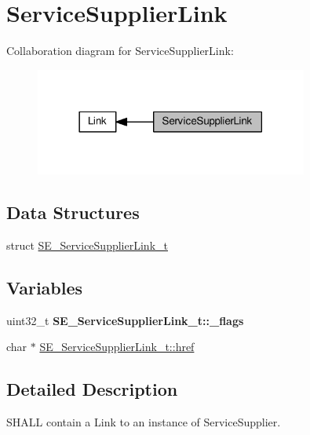 \hypertarget{group__ServiceSupplierLink}{}\section{Service\+Supplier\+Link}
\label{group__ServiceSupplierLink}
Collaboration diagram for Service\+Supplier\+Link\+:\nopagebreak
\begin{figure}[H]
\begin{center}
\leavevmode
\includegraphics[width=254pt]{group__ServiceSupplierLink}
\end{center}
\end{figure}
\subsection*{Data Structures}
\begin{DoxyCompactItemize}
\item 
struct \hyperlink{structSE__ServiceSupplierLink__t}{S\+E\+\_\+\+Service\+Supplier\+Link\+\_\+t}
\end{DoxyCompactItemize}
\subsection*{Variables}
\begin{DoxyCompactItemize}
\item 
\mbox{\label{group__ServiceSupplierLink_gaffd3096ebae224a19d9b6430dd13fb06}} 
uint32\+\_\+t {\bfseries S\+E\+\_\+\+Service\+Supplier\+Link\+\_\+t\+::\+\_\+flags}
\item 
char $\ast$ \hyperlink{group__ServiceSupplierLink_ga528fc874ceb80ade0f0281a159f5a6d5}{S\+E\+\_\+\+Service\+Supplier\+Link\+\_\+t\+::href}
\end{DoxyCompactItemize}


\subsection{Detailed Description}
S\+H\+A\+LL contain a Link to an instance of Service\+Supplier. 

